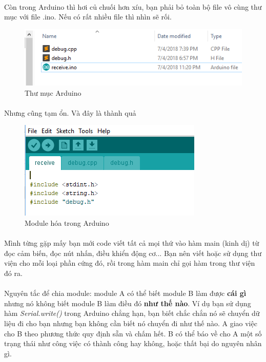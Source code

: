 \documentclass[12pt,a5paper]{book}
\begin{document}
\paragraph{}
Còn trong Arduino thì hơi củ chuối hơn xíu, bạn phải bỏ toàn bộ file vô cùng thư mục với file .ino. Nếu có rất nhiều file thì nhìn sẽ rối.
\newpage 
\begin{figure}[h!]
\centering
 \includegraphics[width=1\linewidth]{arduino_folder.png}
 \caption{Thư mục Arduino}
\end{figure}
\paragraph{}
Nhưng cũng tạm ổn. Và đây là thành quả
\begin{figure}[h!]
\centering
 \includegraphics[width=0.8\linewidth]{arduino.png}
 \caption{Module hóa trong Arduino}
\end{figure}
\paragraph{}
Mình từng gặp mấy bạn mới code viết tất cả mọi thứ vào hàm main (kinh dị) từ đọc cảm biến, đọc nút nhấn, điều khiển động cơ... Bạn nên viết hoặc sử dụng thư viện cho mỗi loại phần cứng đó, rồi trong hàm main chỉ gọi hàm trong thư viện đó ra.
\paragraph{}
Nguyên tắc để chia module: module A có thể biết module B làm được \textbf{cái gì} nhưng nó không biết module B làm điều đó \textbf{như thế nào}. Ví dụ bạn sử dụng hàm \textit{Serial.write()} trong Arduino chẳng hạn, bạn biết chắc chắn nó sẽ chuyển dữ liệu đi cho bạn nhưng bạn không cần biết nó chuyển đi như thế nào. A giao việc cho B theo phương thức quy định sẵn và chấm hết. B có thể báo về cho A một số trạng thái như công việc có thành công hay không, hoặc thất bại do nguyên nhân gì.
\end{document}
